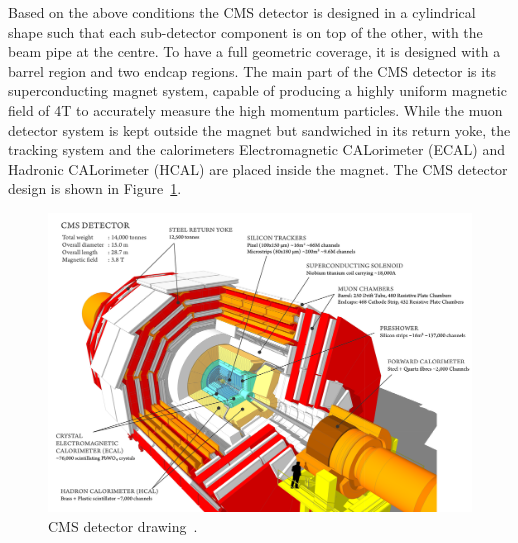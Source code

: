 {{{%
Based on the above conditions the CMS detector is designed in a cylindrical shape such that each sub-detector component is on top of the other, with the beam pipe at the centre. To have a full geometric coverage, it is designed with a barrel region and two endcap regions. The main part of the CMS detector is its superconducting magnet system, capable of producing a highly uniform magnetic field of 4T to accurately measure the high momentum particles. While the muon detector system is kept outside the magnet but sandwiched in its return yoke, the tracking system and the calorimeters Electromagnetic CALorimeter (ECAL) and Hadronic CALorimeter (HCAL) are placed inside the magnet. The CMS detector design is shown in Figure~\ref{fig:CMS-detector}.
\begin{figure}[!htbp]
	\centering
	\includegraphics[width=1.3\textwidth]{figures/LHC/cms_120918_03.png}
	\caption{CMS detector drawing~\cite{Taylor2011}.}
	\label{fig:CMS-detector}
\end{figure}

}}}
